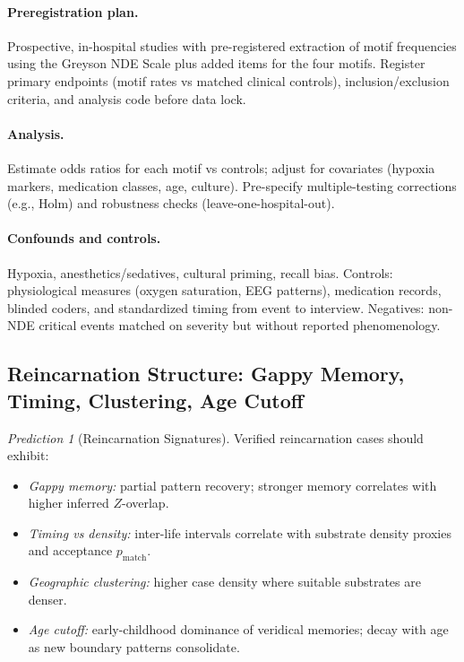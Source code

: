\documentclass[11pt,letterpaper]{article}
\theoremstyle{definition}
\theoremstyle{remark}
\newtheorem{prediction}[theorem]{Prediction}
\begin{document}
\paragraph{Preregistration plan.}
Prospective, in-hospital studies with pre-registered extraction of motif frequencies using the Greyson NDE Scale plus added items for the four motifs. Register primary endpoints (motif rates vs matched clinical controls), inclusion/exclusion criteria, and analysis code before data lock.

\paragraph{Analysis.}
Estimate odds ratios for each motif vs controls; adjust for covariates (hypoxia markers, medication classes, age, culture). Pre-specify multiple-testing corrections (e.g., Holm) and robustness checks (leave-one-hospital-out).

\paragraph{Confounds and controls.}
Hypoxia, anesthetics/sedatives, cultural priming, recall bias. Controls: physiological measures (oxygen saturation, EEG patterns), medication records, blinded coders, and standardized timing from event to interview. Negatives: non-NDE critical events matched on severity but without reported phenomenology.

\subsection{Reincarnation Structure: Gappy Memory, Timing, Clustering, Age Cutoff}

\begin{prediction}[Reincarnation Signatures]
Verified reincarnation cases should exhibit:
\begin{itemize}
  \item \emph{Gappy memory:} partial pattern recovery; stronger memory correlates with higher inferred \(Z\)-overlap.
  \item \emph{Timing vs density:} inter-life intervals correlate with substrate density proxies and acceptance \(p_{\mathrm{match}}\).
  \item \emph{Geographic clustering:} higher case density where suitable substrates are denser.
  \item \emph{Age cutoff:} early-childhood dominance of veridical memories; decay with age as new boundary patterns consolidate.
\end{itemize}
\end{prediction}
\end{document}

